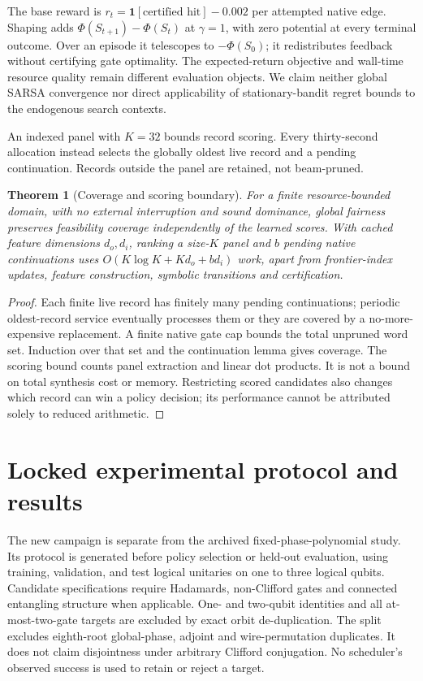 \documentclass[11pt]{article}
\newtheorem{theorem}{Theorem}
\begin{document}
The base reward is $r_t=\mathbf1[\text{certified hit}]-0.002$ per attempted native edge. Shaping adds $\Phi(S_{t+1})-\Phi(S_t)$ at $\gamma=1$, with zero potential at every terminal outcome. Over an episode it telescopes to $-\Phi(S_0)$; it redistributes feedback without certifying gate optimality. The expected-return objective and wall-time resource quality remain different evaluation objects. We claim neither global SARSA convergence nor direct applicability of stationary-bandit regret bounds to the endogenous search contexts.

An indexed panel with $K=32$ bounds record scoring. Every thirty-second allocation instead selects the globally oldest live record and a pending continuation. Records outside the panel are retained, not beam-pruned.
\begin{theorem}[Coverage and scoring boundary]
For a finite resource-bounded domain, with no external interruption and sound dominance, global fairness preserves feasibility coverage independently of the learned scores. With cached feature dimensions $d_o,d_i$, ranking a size-$K$ panel and $b$ pending native continuations uses $O(K\log K+Kd_o+bd_i)$ work, apart from frontier-index updates, feature construction, symbolic transitions and certification.
\end{theorem}
\begin{proof}
Each finite live record has finitely many pending continuations; periodic oldest-record service eventually processes them or they are covered by a no-more-expensive replacement. A finite native gate cap bounds the total unpruned word set. Induction over that set and the continuation lemma gives coverage. The scoring bound counts panel extraction and linear dot products. It is not a bound on total synthesis cost or memory. Restricting scored candidates also changes which record can win a policy decision; its performance cannot be attributed solely to reduced arithmetic.
\end{proof}

\section{Locked experimental protocol and results}
The new campaign is separate from the archived fixed-phase-polynomial study. Its protocol is generated before policy selection or held-out evaluation, using \TrainingCases{} training, \ValidationCases{} validation, and \TestCases{} test logical unitaries on one to three logical qubits. Candidate specifications require Hadamards, non-Clifford gates and connected entangling structure when applicable. One- and two-qubit identities and all at-most-two-gate targets are excluded by exact orbit de-duplication. The split excludes eighth-root global-phase, adjoint and wire-permutation duplicates. It does not claim disjointness under arbitrary Clifford conjugation. No scheduler's observed success is used to retain or reject a target.
\end{document}
